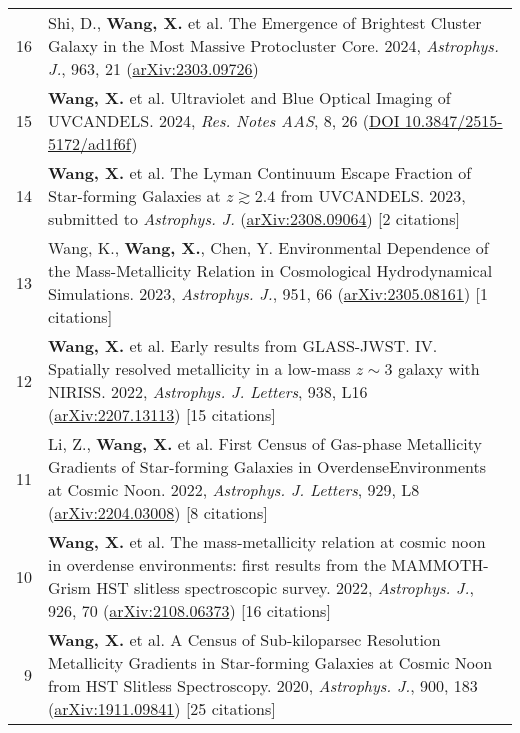 \documentclass[letterpaper,10pt]{article}
\begin{document}
\begin{longtable}{rp{6.3in}}
16 & Shi, D., \textbf{Wang, X.} et al. The Emergence of Brightest Cluster Galaxy in the Most Massive Protocluster Core. 2024, \textit{Astrophys. J.}, 963, 21 (\href{https://arxiv.org/abs/2303.09726}{arXiv:2303.09726}) \\

15 &  \textbf{Wang, X.} et al. Ultraviolet and Blue Optical Imaging of UVCANDELS. 2024, \textit{Res. Notes AAS}, 8, 26 (\href{https://iopscience.iop.org/article/10.3847/2515-5172/ad1f6f}{DOI 10.3847/2515-5172/ad1f6f})  \\

14 &  \textbf{Wang, X.} et al. The Lyman Continuum Escape Fraction of Star-forming Galaxies at $z\gtrsim2.4$ from UVCANDELS. 2023, submitted to \textit{Astrophys. J.} (\href{https://arxiv.org/abs/2308.09064}{arXiv:2308.09064}) [2 citations] \\

13 &  Wang, K., \textbf{Wang, X.}, Chen, Y. Environmental Dependence of the Mass-Metallicity Relation in Cosmological Hydrodynamical Simulations. 2023, \textit{Astrophys. J.}, 951, 66 (\href{https://arxiv.org/abs/2305.08161}{arXiv:2305.08161}) [1 citations]    \\

12 &  \textbf{Wang, X.} et al. Early results from GLASS-JWST. IV. Spatially resolved metallicity in a low-mass $z\sim3$ galaxy with NIRISS. 2022, \textit{Astrophys. J. Letters}, 938, L16 (\href{https://arxiv.org/abs/2207.13113}{arXiv:2207.13113}) [15 citations] \\

11 &  Li, Z., \textbf{Wang, X.} et al. First Census of Gas-phase Metallicity Gradients of Star-forming Galaxies in OverdenseEnvironments at Cosmic Noon. 2022, \textit{Astrophys. J. Letters}, 929, L8 (\href{https://arxiv.org/abs/2204.03008}{arXiv:2204.03008}) [8 citations] \\

10 &  \textbf{Wang, X.} et al. The mass-metallicity relation at cosmic noon in overdense environments: first results from the MAMMOTH-Grism HST slitless spectroscopic survey. 2022, \textit{Astrophys. J.}, 926, 70 (\href{https://arxiv.org/abs/2108.06373}{arXiv:2108.06373}) [16 citations] \\

9 &  \textbf{Wang, X.} et al. A Census of Sub-kiloparsec Resolution Metallicity Gradients in Star-forming Galaxies at Cosmic Noon from HST Slitless Spectroscopy. 2020, \textit{Astrophys. J.}, 900, 183 (\href{https://arxiv.org/abs/1911.09841}{arXiv:1911.09841}) [25 citations] \\


\end{longtable}
\end{document}
